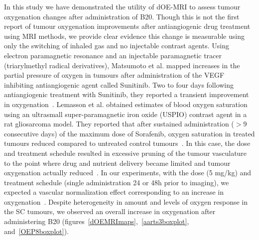 In this study we have demonstrated the utility of \acs{dOE-MRI} to assess tumour oxygenation changes after administration of B20.
Though this is not the first report of tumour oxygenation improvements after antiangiogenic drug treatment using MRI methods, we provide clear evidence this change is measurable using only the switching of inhaled gas and no injectable contrast agents.
Using electron paramagnetic resonance and an injectable paramagnetic tracer (triarylmethyl radical derivatives), Matsumoto et al. mapped increases in the partial pressure of oxygen in tumours after administration of the VEGF inhibiting antiangiogenic agent called Sunitinib.
Two to four days following antiangiogenic treatment with Sunitinib, they reported a transient improvement in oxygenation~\cite{Matsumoto:2011iv}.
Lemasson et al. obtained estimates of blood oxygen saturation using an ultrasmall super-paramagnetic iron oxide (\acs{USPIO}) contrast agent in a rat gliosarcoma model.
They reported that after sustained administration ($>$9 consecutive days) of the maximum dose of Sorafenib, oxygen saturation in treated tumours reduced compared to untreated control tumours~\cite{Lemasson:2012dl}.
In this case, the dose and treatment schedule resulted in excessive pruning of the tumour vasculature to the point where drug and nutrient delivery became limited and tumour oxygenation actually reduced~\cite{Jain:2013jc}.
In our experiments, with the dose (5 mg/kg) and treatment schedule (single administration 24 or 48h prior to imaging), we expected a vascular normalization effect corresponding to an increase in oxygenation~\cite{Chauhan:2012bm,Jain:2013jc,Huang:2012kn}.
Despite heterogeneity in amount and levels of oxygen response in the \acs{SC} tumours, we observed an overall increase in oxygenation after administering B20 (figures~\ref{dOEMRImaps},~\ref{aarts3boxplot}, and~\ref{OEP8boxplot}).

